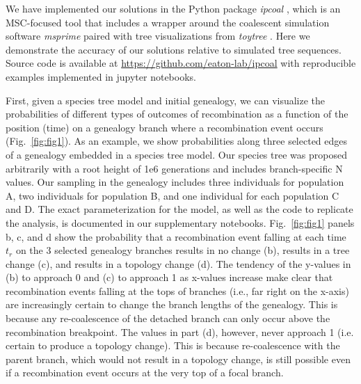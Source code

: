 \documentclass[11pt]{article}
\begin{document}
We have implemented our solutions in the Python package \emph{ipcoal} 
\citep{mckenzie_ipcoal_2020}, which is an MSC-focused tool that includes
a wrapper around the coalescent simulation software \emph{msprime}
\citep{baumdicker_efficient_2022} paired with tree visualizations from
\emph{toytree} \citep{eaton_toytree_2020}. 
Here we demonstrate
the accuracy of our solutions relative to simulated tree sequences.
Source code is available at \url{https://github.com/eaton-lab/ipcoal}
with reproducible examples implemented in jupyter notebooks.


First, given a species tree model and initial genealogy, we can visualize the 
probabilities of different types of outcomes of recombination as a 
function of the position (time) on a genealogy branch where a recombination 
event occurs (Fig.~\ref{fig:fig1}). As an example, we show probabilities along
three selected edges of a genealogy embedded in a species tree model. Our species 
tree was proposed arbitrarily with a root height of 1e6 generations and 
includes branch-specific N values. Our sampling in the genealogy includes three individuals
for population A, two individuals for population B, and one individual for each 
population C and D. The exact parameterization for the model, as well as the 
code to replicate the analysis, is documented in our supplementary notebooks.
Fig.~\ref{fig:fig1} panels b, c, and d show the probability that a recombination event 
falling at each time $t_r$ on the 3 selected genealogy branches results in no change 
(b), results in a tree change (c), and results in a topology change (d).  
The tendency of the y-values in (b) to approach 0 and (c) to approach 1 as x-values increase 
make clear that recombination events falling at the tops of branches 
(i.e., far right on the x-axis) are increasingly certain to change the branch lengths 
of the genealogy. This is because any re-coalescence of the detached branch can only occur 
above the recombination breakpoint. The values in part (d), however, never approach 1 (i.e. 
certain to produce a topology change). This is because re-coalescence with the parent branch, 
which would not result in a topology change, is still possible even if 
a recombination event occurs at the very top of a focal branch. 
\end{document}
